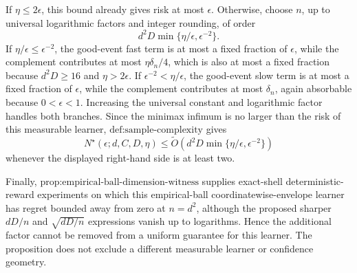 If \(\eta\le2\epsilon\), this bound already gives risk at most \(\epsilon\). Otherwise, choose \(n\), up to universal logarithmic factors and integer rounding, of order
\[
d^2D\min\{\eta/\epsilon,\epsilon^{-2}\}.
\]
If \(\eta/\epsilon\le\epsilon^{-2}\), the good-event fast term is at most a fixed fraction of \(\epsilon\), while the complement contributes at most \(\eta\delta_n/4\), which is also at most a fixed fraction because \(d^2D\ge16\) and \(\eta>2\epsilon\). If \(\epsilon^{-2}<\eta/\epsilon\), the good-event slow term is at most a fixed fraction of \(\epsilon\), while the complement contributes at most \(\delta_n\), again absorbable because \(0<\epsilon<1\). Increasing the universal constant and logarithmic factor handles both branches. Since the minimax infimum is no larger than the risk of this measurable learner, \(\text{def:sample-complexity}\) gives
\[
N^\star(\epsilon;d,C,D,\eta)
\le\widetilde O\left(d^2D\min\{\eta/\epsilon,\epsilon^{-2}\}\right)
\]
whenever the displayed right-hand side is at least two.

Finally, \(\text{prop:empirical-ball-dimension-witness}\) supplies exact-shell deterministic-reward experiments on which this empirical-ball coordinatewise-envelope learner has regret bounded away from zero at \(n=d^2\), although the proposed sharper \(dD/n\) and \(\sqrt{dD/n}\) expressions vanish up to logarithms. Hence the additional factor cannot be removed from a uniform guarantee for this learner. The proposition does not exclude a different measurable learner or confidence geometry.